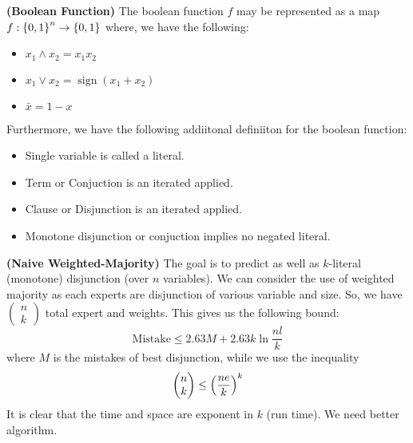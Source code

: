 \begin{definition}{\textbf{(Boolean Function)}}
    The boolean function $f$ may be represented as a map $f : \left\{ 0, 1 \right\}^n\rightarrow \left\{ 0, 1 \right\}$ where, we have the following:
    \begin{itemize}
        \item $x_1\wedge x_2 = x_1x_2$ 
        \item $x_1\vee x_2 = \operatorname{sign}(x_1 + x_2)$ 
        \item $\bar{x} = 1 - x$
    \end{itemize}
    Furthermore, we have the following addiitonal definiiton for the boolean function:
    \begin{itemize}
        \item Single variable is called a literal. 
        \item Term or Conjuction is an iterated  applied. 
        \item Clause or Disjunction is an iterated  applied. 
        \item Monotone disjunction or conjuction implies no negated literal. 
    \end{itemize}
\end{definition}

\begin{remark}{\textbf{(Naive Weighted-Majority)}}
    The goal is to predict as well as $k$-literal (monotone) disjunction (over $n$ variables). We can consider the use of weighted majority as each experts are disjunction of various variable and size. So, we have $\begin{pmatrix}
        n \\ k
    \end{pmatrix}$ total expert and weights. This gives us the following bound:
    \begin{equation*}
        \text{Mistake} \le 2.63 M + 2.63k\ln\frac{nl}{k}
    \end{equation*}
    where $M$ is the mistakes of best disjunction, while we use the inequality 
    \begin{equation*}
        \begin{pmatrix}n \\ k\end{pmatrix}\le \left( \frac{ne}{k} \right)^k 
    \end{equation*}
    It is clear that the time and space are exponent in $k$ (run time). We need better algorithm.
\end{remark}

